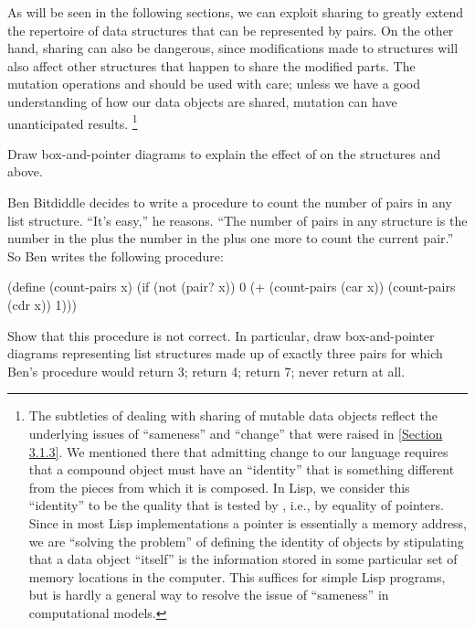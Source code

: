 As will be seen in the following sections, we can exploit sharing to greatly extend the repertoire of data structures that can be represented by pairs.
On the other hand, sharing can also be dangerous, since modifications made to structures will also affect other structures that happen to share the modified parts.
The mutation operations  and  should be used with care;
unless we have a good understanding of how our data objects are shared, mutation can have unanticipated results.%
\footnote{
	The subtleties of dealing with sharing of mutable data objects reflect the underlying issues of “sameness” and “change” that were raised in \cref{Section 3.1.3}.
	We mentioned there that admitting change to our language requires that a compound object must have an “identity” that is something different from the pieces from which it is composed.
	In Lisp, we consider this “identity” to be the quality that is tested by , i.e., by equality of pointers.
	Since in most Lisp implementations a pointer is essentially a memory address, we are “solving the problem” of defining the identity of objects by stipulating that a data object “itself” is the information stored in some particular set of memory locations in the computer.
	This suffices for simple Lisp programs, but is hardly a general way to resolve the issue of “sameness” in computational models.
}



\begin{exercise}
	\label{Exercise 3.15}
	Draw box-and-pointer diagrams to explain the effect of  on the structures  and  above.
\end{exercise}



\begin{exercise}
	\label{Exercise 3.16}
	Ben Bitdiddle decides to write a procedure to count the number of pairs in any list structure.
	“It’s easy,” he reasons.
	“The number of pairs in any structure is the number in the  plus the number in the  plus one more to count the current pair.”
	So Ben writes the following procedure:
	\begin{scheme}
	  (define (count-pairs x)
	    (if (not (pair? x))
	        0
	        (+ (count-pairs (car x))
	           (count-pairs (cdr x))
	           1)))
	\end{scheme}
	Show that this procedure is not correct.
	In particular, draw box-and-pointer diagrams representing list structures made up of exactly three pairs for which Ben’s procedure would return 3;
	return 4;
	return 7;
	never return at all.
\end{exercise}



